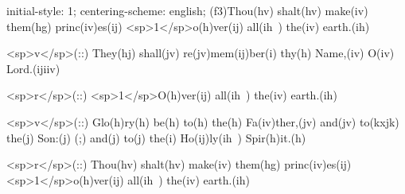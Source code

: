 initial-style: 1;
centering-scheme: english;
(f3)Thou(hv) shalt(hv) make(iv) them(hg) princ(iv)es(ij) <sp>1</sp>o(h)ver(ij) all(ih~) the(iv) earth.(ih)

<sp>v</sp>(::) They(hj) shall(jv) re(jv)mem(ij)ber(i) thy(h) Name,(iv) O(iv) Lord.(ijiiv)

<sp>r</sp>(::) <sp>1</sp>O(h)ver(ij) all(ih~) the(iv) earth.(ih)

<sp>v</sp>(::) Glo(h)ry(h) be(h) to(h) the(h) Fa(iv)ther,(jv) and(jv) to(kxjk) the(j) Son:(j) (;) and(j) to(j) the(i) Ho(ij)ly(ih~) Spir(h)it.(h)

<sp>r</sp>(::) Thou(hv) shalt(hv) make(iv) them(hg) princ(iv)es(ij) <sp>1</sp>o(h)ver(ij) all(ih~) the(iv) earth.(ih)